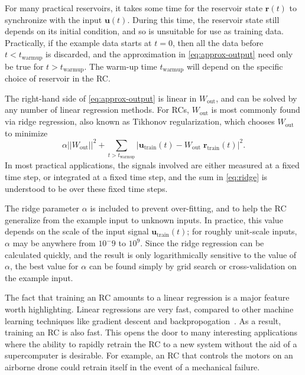For many practical reservoirs, it takes some time for the reservoir
state $\bm{r}(t)$ to synchronize with the input $\bm{u}(t)$. During
this time, the reservoir state still depends on its initial condition,
and so is unsuitable for use as training data. Practically, if the
example data starts at $t = 0$, then all the data before $t <
t_\text{warmup}$ is discarded, and the approximation in
\cref{eq:approx-output} need only be true for $t >
t_\text{warmup}$. The warm-up time $t_\text{warmup}$ will depend on the
specific choice of reservoir in the RC.

The right-hand side of \cref{eq:approx-output} is linear in
$W_\text{out}$, and can be solved by any number of linear regression
methods. For RCs, $W_\text{out}$ is most commonly found via ridge
regression, also known as Tikhonov regularization, which chooses
$W_\text{out}$ to minimize
\begin{equation}
  \label{eq:ridge}
  \alpha ||W_\text{out}||^2 + \sum_{t>t_\text{warmup}} |\mathbf{u}_\text{train}(t) - W_\text{out}\;\mathbf{r}_\text{train}(t)|^2.
\end{equation}
In most practical applications, the signals involved are either
measured at a fixed time step, or integrated at a fixed time step, and
the sum in \cref{eq:ridge} is understood to be over these fixed time
steps.

The ridge parameter $\alpha$ is included to prevent over-fitting, and
to help the RC generalize from the example input to unknown inputs. In
practice, this value depends on the scale of the input signal
$\bm{u}_\text{train}(t)$; for roughly unit-scale inputs, $\alpha$ may be
anywhere from $10^-{9}$ to $10^9$. Since the ridge regression can be
calculated quickly, and the result is only logarithmically sensitive
to the value of $\alpha$, the best value for $\alpha$ can be found
simply by grid search or cross-validation on the example input.

The fact that training an RC amounts to a linear regression is a major
feature worth highlighting. Linear regressions are very fast, compared
to other machine learning techniques like gradient descent and
backpropogation~\cite{lukosevicius2009}. As a result, training an RC
is also fast. This opens the door to many interesting applications
where the ability to rapidly retrain the RC to a new system without the aid of
a supercomputer is desirable. For example, an RC that controls the
motors on an airborne drone could retrain itself in the event of a
mechanical failure.

